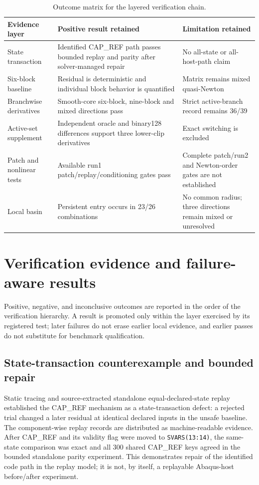 \documentclass[preprint,12pt,authoryear]{elsarticle}
\begin{document}
\begin{table}[!htbp]
\centering
\caption{Outcome matrix for the layered verification chain.}
\label{tab:3}
\small
\begin{tabularx}{\textwidth}{@{}*{3}{>{\raggedright\arraybackslash}X}@{}}
\toprule
Evidence layer & Positive result retained & Limitation retained \\
\midrule
State transaction & Identified CAP\_\allowbreak{}REF path passes bounded replay and parity after solver-managed repair & No all-state or all-host-path claim \\
Six-block baseline & Residual is deterministic and individual block behavior is quantified & Matrix remains mixed quasi-Newton \\
Branchwise derivatives & Smooth-core six-block, nine-block and mixed directions pass & Strict active-branch record remains 36/39 \\
Active-set supplement & Independent oracle and binary128 differences support three lower-clip derivatives & Exact switching is excluded \\
Patch and nonlinear tests & Available run1 patch/replay/conditioning gates pass & Complete patch/run2 and Newton-order gates are not established \\
Local basin & Persistent entry occurs in 23/26 combinations & No common radius; three directions remain mixed or unresolved \\
\bottomrule
\end{tabularx}
\end{table}

\section{Verification evidence and failure-aware results}

Positive, negative, and inconclusive outcomes are reported in the order of the verification hierarchy. A result is promoted only within the layer exercised by its registered test; later failures do not erase earlier local evidence, and earlier passes do not substitute for benchmark qualification.

\subsection{State-transaction counterexample and bounded repair}

Static tracing and source-extracted standalone equal-declared-state replay established the CAP\_\allowbreak{}REF mechanism as a state-transaction defect: a rejected trial changed a later residual at identical declared inputs in the unsafe baseline. The component-wise replay records are distributed as machine-readable evidence. After CAP\_\allowbreak{}REF and its validity flag were moved to \texttt{SVARS(13:14)}, the same-state comparison was exact and all 300 shared CAP\_\allowbreak{}REF keys agreed in the bounded standalone parity experiment. This demonstrates repair of the identified code path in the replay model; it is not, by itself, a replayable Abaqus-host before/after experiment.
\end{document}

